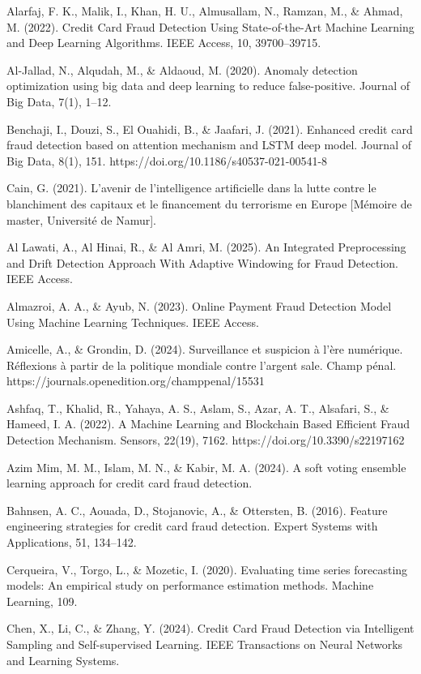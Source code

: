 Alarfaj, F. K., Malik, I., Khan, H. U., Almusallam, N., Ramzan, M., \& Ahmad, M. (2022). Credit Card Fraud Detection Using State-of-the-Art Machine Learning and Deep Learning Algorithms. IEEE Access, 10, 39700–39715.

Al-Jallad, N., Alqudah, M., \& Aldaoud, M. (2020). Anomaly detection optimization using big data and deep learning to reduce false-positive. Journal of Big Data, 7(1), 1–12.

Benchaji, I., Douzi, S., El Ouahidi, B., \& Jaafari, J. (2021). Enhanced credit card fraud detection based on attention mechanism and LSTM deep model. Journal of Big Data, 8(1), 151. https://doi.org/10.1186/s40537-021-00541-8

Cain, G. (2021). L'avenir de l'intelligence artificielle dans la lutte contre le blanchiment des capitaux et le financement du terrorisme en Europe [Mémoire de master, Université de Namur].

Al Lawati, A., Al Hinai, R., \& Al Amri, M. (2025). An Integrated Preprocessing and Drift Detection Approach With Adaptive Windowing for Fraud Detection. IEEE Access.

Almazroi, A. A., \& Ayub, N. (2023). Online Payment Fraud Detection Model Using Machine Learning Techniques. IEEE Access.

Amicelle, A., \& Grondin, D. (2024). Surveillance et suspicion à l'ère numérique. Réflexions à partir de la politique mondiale contre l'argent sale. Champ pénal. https://journals.openedition.org/champpenal/15531

Ashfaq, T., Khalid, R., Yahaya, A. S., Aslam, S., Azar, A. T., Alsafari, S., \& Hameed, I. A. (2022). A Machine Learning and Blockchain Based Efficient Fraud Detection Mechanism. Sensors, 22(19), 7162. https://doi.org/10.3390/s22197162

Azim Mim, M. M., Islam, M. N., \& Kabir, M. A. (2024). A soft voting ensemble learning approach for credit card fraud detection.

Bahnsen, A. C., Aouada, D., Stojanovic, A., \& Ottersten, B. (2016). Feature engineering strategies for credit card fraud detection. Expert Systems with Applications, 51, 134–142.

Cerqueira, V., Torgo, L., \& Mozetic, I. (2020). Evaluating time series forecasting models: An empirical study on performance estimation methods. Machine Learning, 109.

Chen, X., Li, C., \& Zhang, Y. (2024). Credit Card Fraud Detection via Intelligent Sampling and Self-supervised Learning. IEEE Transactions on Neural Networks and Learning Systems.

